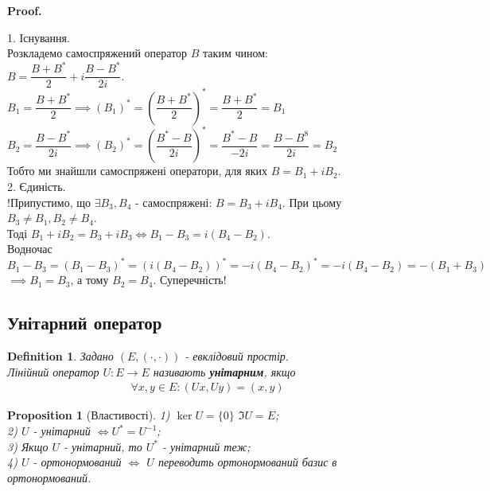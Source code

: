 \documentclass[a4paper, 10pt]{article}
\makeatletter
\theoremstyle{theoremdd}
\newtheorem{definition}[theorem]{Definition}
\newtheorem{proposition}[theorem]{Proposition}
\renewenvironment{proof}[1][Proof.\\]{\par
\pushQED{\hfill \qed}%
\normalfont \topsep6\p@\@plus6\p@\relax
\trivlist
\item\relax
{\bfseries
#1\@addpunct{.}}\hspace\labelsep\ignorespaces
}{%
\popQED\endtrivlist\@endpefalse
}
\makeatother
\begin{document}
\begin{proof}
1. Існування.\\
Розкладемо самоспряжений оператор $B$ таким чином:\\
$B = \dfrac{B+B^*}{2}+ i \dfrac{B-B^*}{2i}$.\\
$B_1 = \dfrac{B+B^*}{2} \implies (B_1)^* = \left( \dfrac{B+B^*}{2} \right)^* = \dfrac{B+B^*}{2} = B_1$\\
$B_2 = \dfrac{B-B^*}{2i} \implies (B_2)^* = \left( \dfrac{B^*-B}{2i} \right)^* = \dfrac{B^*-B}{-2i} = \dfrac{B-B^8}{2i} = B_2$\\
Тобто ми знайшли самоспряжені оператори, для яких $B = B_1 + iB_2$.
\bigskip \\
2. Єдиність.\\
!Припустимо, що $\exists B_3, B_4$ - самоспряжені: $B = B_3 + i B_4$. При цьому $B_3 \neq B_1, B_2 \neq B_4$.\\
Тоді $B_1 + iB_2 = B_3 + iB_3 \iff B_1-B_3 = i(B_4-B_2)$.\\
Водночас $B_1-B_3=(B_1-B_3)^* = (i(B_4-B_2))^* = -i(B_4-B_2)^* = -i(B_4-B_2) = -(B_1+B_3)$\\
$\implies B_1 = B_3$, а тому $B_2 = B_4$. Суперечність!
\end{proof}

\iffalse
\prp{5.9.4.} Заданий $E$ - евклідовий простір із $(\cdot,\cdot)$\\
Тоді $\forall B: \exists! B_1$ - самоспряжений, $\exists! B_2$ - кососпряжений, тобто $B_2^* = -B_2$: $B = B_1 + B_2$\\
\proof
Запишемо $B$ таким чином:\\
$B = \dfrac{B+B^*}{2} + \dfrac{B-B^*}{2} = B_1 + B_2$\\
Зрозуміло, що перший - сампоспряжений, а другий - кососпряжений\\
Єдиність доводиться аналогічно \qed
\fi

\subsection{Унітарний оператор}
\begin{definition}
Задано $(E,(\cdot,\cdot))$ - евклідовий простір.\\
Лінійний оператор $U: E \to E$ називають \textbf{унітарним}, якщо
\begin{align*}
\forall x,y \in E: (Ux,Uy) = (x,y)
\end{align*}
\end{definition}

\begin{proposition}[Властивості]
1) $\ker U = \{0\}$ \hspace{1cm} $\Im U = E$;\\
2) $U$ - унітарний $\iff U^* = U^{-1}$;\\
3) Якщо $U$ - унітарний, то $U^*$ - унітарний теж;\\
4) $U$ - ортонормований $\iff$ $U$ переводить ортонормований базис в ортонормований.
\end{proposition}
\end{document}
